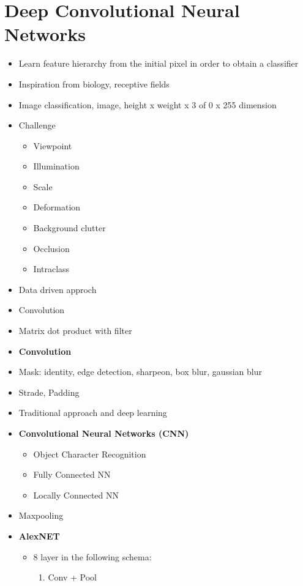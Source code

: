 \documentclass[12pt,oneside]{report}
\begin{document}
\chapter{Deep Convolutional Neural Networks}
\begin{itemize}
    \item Learn feature hierarchy from the initial pixel in order to obtain a classifier
    \item Inspiration from biology, receptive fields
    \item Image classification, image, height x weight x 3 of 0 x 255 dimension
    \item Challenge
    \begin{itemize}
        \item Viewpoint 
        \item Illumination 
        \item Scale
        \item Deformation
        \item Background clutter
        \item Occlusion
        \item Intraclass 
    \end{itemize}
    \item Data driven approch
     \item Convolution
    \item Matrix dot product with filter
    \item \textbf{Convolution}
    \item Mask: identity, edge detection, sharpeon, box blur, gaussian blur
    \item Strade, Padding
    \item Traditional approach and deep learning
    \item \textbf{Convolutional Neural Networks (CNN)}
    \begin{itemize}
        \item Object Character Recognition
        \item Fully Connected NN
        \item Locally Connected NN
    \end{itemize}
    \item Maxpooling
    \item \textbf{AlexNET}
    \begin{itemize}
        \item 8 layer in the following schema:
        \begin{enumerate}
            \item Conv + Pool

\end{enumerate}
\end{itemize}
\end{itemize}
\end{document}
